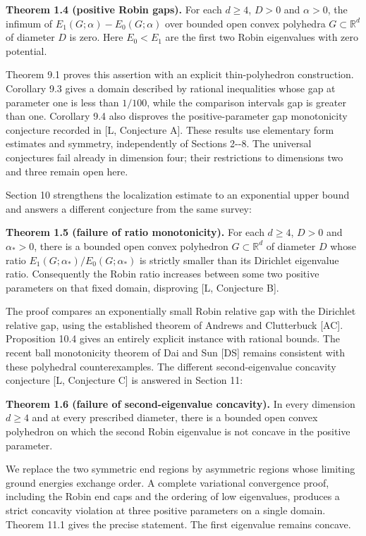 \documentclass[11pt]{article}
\begin{document}
\textbf{Theorem 1.4 (positive Robin gaps).} For each \(d\ge4\), \(D>0\)
and \(\alpha>0\), the infimum of \(E_1(G;\alpha)-E_0(G;\alpha)\) over
bounded open convex polyhedra \(G\subset\mathbb R^d\) of diameter \(D\)
is zero. Here \(E_0<E_1\) are the first two Robin eigenvalues with zero
potential.

Theorem 9.1 proves this assertion with an explicit thin-polyhedron
construction. Corollary 9.3 gives a domain described by rational
inequalities whose gap at parameter one is less than \(1/100\), while
the comparison interval\textquotesingle s gap is greater than one.
Corollary 9.4 also disproves the positive-parameter gap monotonicity
conjecture recorded in {[}L, Conjecture A{]}. These results use
elementary form estimates and symmetry, independently of Sections
2-\/-8. The universal conjectures fail already in dimension four; their
restrictions to dimensions two and three remain open here.

Section 10 strengthens the localization estimate to an exponential upper
bound and answers a different conjecture from the same survey:

\textbf{Theorem 1.5 (failure of ratio monotonicity).} For each
\(d\ge4\), \(D>0\) and \(\alpha_*>0\), there is a bounded open convex
polyhedron \(G\subset\mathbb R^d\) of diameter \(D\) whose ratio
\(E_1(G;\alpha_*)/E_0(G;\alpha_*)\) is strictly smaller than its
Dirichlet eigenvalue ratio. Consequently the Robin ratio increases
between some two positive parameters on that fixed domain, disproving
{[}L, Conjecture B{]}.

The proof compares an exponentially small Robin relative gap with the
Dirichlet relative gap, using the established theorem of Andrews and
Clutterbuck {[}AC{]}. Proposition 10.4 gives an entirely explicit
instance with rational bounds. The recent ball monotonicity theorem of
Dai and Sun {[}DS{]} remains consistent with these polyhedral
counterexamples. The different second-eigenvalue concavity conjecture
{[}L, Conjecture C{]} is answered in Section 11:

\textbf{Theorem 1.6 (failure of second-eigenvalue concavity).} In every
dimension \(d\ge4\) and at every prescribed diameter, there is a bounded
open convex polyhedron on which the second Robin eigenvalue is not
concave in the positive parameter.

We replace the two symmetric end regions by asymmetric regions whose
limiting ground energies exchange order. A complete variational
convergence proof, including the Robin end caps and the ordering of low
eigenvalues, produces a strict concavity violation at three positive
parameters on a single domain. Theorem 11.1 gives the precise statement.
The first eigenvalue remains concave.
\end{document}
